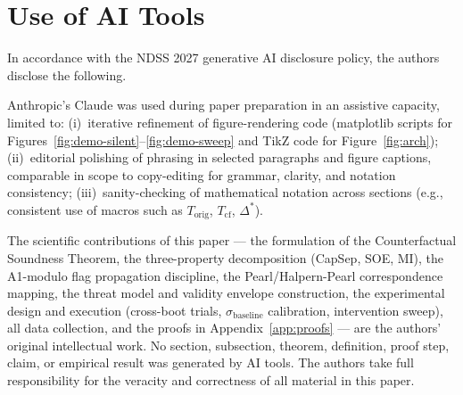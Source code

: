 \documentclass[conference]{IEEEtran}
\newcommand{\Korig}{T_\text{orig}}
\newcommand{\Tcf}{T_\text{cf}}
\newcommand{\sigbase}{\hat{\sigma}_\text{baseline}}
\newcommand{\Dstar}{\Delta^{*}}
\begin{document}
\section{Use of AI Tools}\label{app:ai-disclosure}

In accordance with the NDSS 2027 generative AI disclosure
policy, the authors disclose the following.

Anthropic's Claude was used during paper preparation in an
assistive capacity, limited to: (i)~iterative refinement of
figure-rendering code (matplotlib scripts for
Figures~\ref{fig:demo-silent}--\ref{fig:demo-sweep} and TikZ
code for Figure~\ref{fig:arch}); (ii)~editorial polishing of
phrasing in selected paragraphs and figure captions, comparable
in scope to copy-editing for grammar, clarity, and notation
consistency; (iii)~sanity-checking of mathematical notation
across sections (e.g., consistent use of macros such as
$\Korig$, $\Tcf$, $\Dstar$).

The scientific contributions of this paper --- the formulation
of the Counterfactual Soundness Theorem, the three-property
decomposition (CapSep, SOE, MI), the A1-modulo flag
propagation discipline, the Pearl/Halpern-Pearl correspondence
mapping, the threat model and validity envelope construction,
the experimental design and execution (cross-boot trials,
$\sigbase$ calibration, intervention sweep), all data
collection, and the proofs in Appendix~\ref{app:proofs} ---
are the authors' original intellectual work. No section,
subsection, theorem, definition, proof step, claim, or
empirical result was generated by AI tools. The authors take
full responsibility for the veracity and correctness of all
material in this paper.
\end{document}

